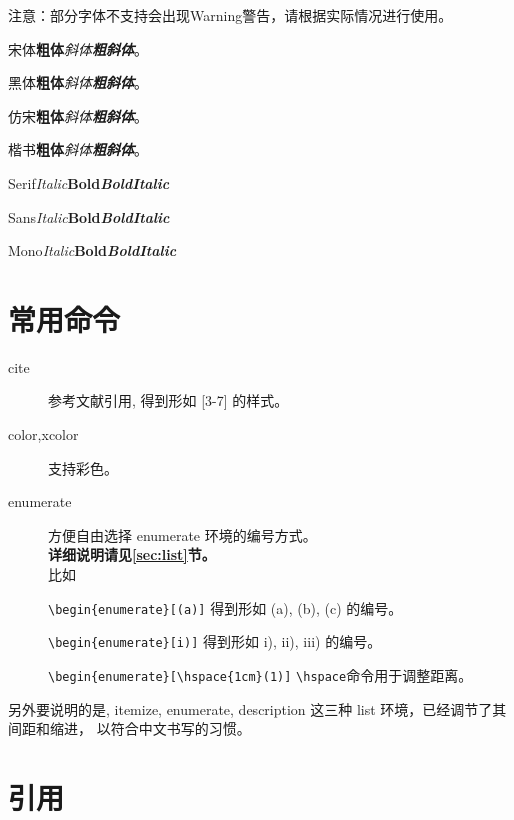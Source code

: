 注意：部分字体不支持会出现Warning警告，请根据实际情况进行使用。

宋体\quad \textbf{粗体}\quad \textit{斜体}\quad \textbf{\textit{粗斜体}}。

{\heiti 黑体\quad \textbf{粗体}\quad \textit{斜体}\quad \textbf{\textit{粗斜体}}}。

{\fangsong 仿宋\quad \textbf{粗体}\quad \textit{斜体}\quad \textbf{\textit{粗斜体}}}。

{\kaishu 楷书\quad \textbf{粗体}\quad \textit{斜体}\quad \textbf{\textit{粗斜体}}}。

Serif\quad \textit{Italic}\quad \textbf{Bold}\quad \textbf{\textit{BoldItalic}}

{\sffamily Sans\quad \textit{Italic}\quad \textbf{Bold}\quad \textbf{\textit{BoldItalic}}}

{\ttfamily Mono\quad \textit{Italic}\quad \textbf{Bold}\quad \textbf{\textit{BoldItalic}}}


\section{常用命令}

\begin{description}
  \item[cite]  参考文献引用, 得到形如 [3-7] 的样式。
  \item[color,xcolor]  支持彩色。
  \item[enumerate]  方便自由选择 enumerate 环境的编号方式。\\
  \textbf{详细说明请见\ref{sec:list}节。} \\
  比如

  \verb|\begin{enumerate}[(a)]| 得到形如 (a), (b), (c) 的编号。


  \verb|\begin{enumerate}[i)]| 得到形如 i), ii), iii) 的编号。

  \verb|\begin{enumerate}[\hspace{1cm}(1)]| \verb|\hspace|命令用于调整距离。

\end{description}

另外要说明的是, itemize, enumerate, description 这三种 list 环境，已经调节了其间距和缩进，
以符合中文书写的习惯。


\section{引用}

